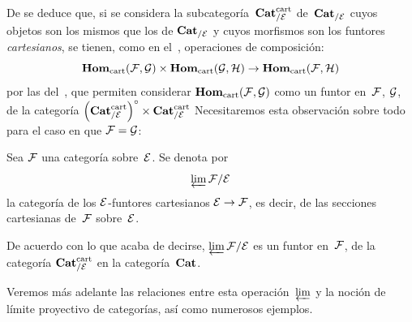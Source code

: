 De
se deduce que, si se considera la subcategoría~$\Cat^\cart_{/\cal{E}}$
\label{indnot:fr}%
de~$\Cat_{/\cal{E}}$ cuyos objetos son los mismos que los de
$\Cat_{/\cal{E}}$ y cuyos morfismos son los funtores \emph{cartesianos},
se tienen, como en el~\No {}, operaciones de composición:
$$
\SheafHom_\cart(\cal{F},\cal{G})\times
\SheafHom_\cart(\cal{G},\cal{H})\to\SheafHom_\cart(\cal{F},\cal{H})
$$
por las del~\No {}, que permiten considerar
$\SheafHom_\cart(\cal{F},\cal{G})$ como un funtor en~$\cal{F}$,
$\cal{G}$, de la categoría $\left(\Cat^\cart_{/\cal{E}}\right)^\circ
\times\Cat^\cart_{/\cal{E}}$
Necesitaremos esta observación sobre todo para el caso en que
$\cal{F}=\cal{G}$:

\begin{definition}
\label{VI.5.5}
Sea $\cal{F}$ una categoría sobre~$\cal{E}$. Se denota por
$$
\varprojLim\cal{F}/\cal{E}
$$
\label{indnot:fs}%
la categoría de los $\cal{E}$-funtores cartesianos
$\cal{E}\to\cal{F}$, es decir, de las secciones cartesianas de~$\cal{F}$
sobre~$\cal{E}$.
\end{definition}

De acuerdo con lo que acaba de decirse,
$\varprojLim\cal{F}/\cal{E}$ es un funtor en~$\cal{F}$, de la categoría
$\Cat^\cart_{/\cal{E}}$ en la categoría~$\Cat$.

Veremos más adelante las relaciones entre esta operación~$\varprojLim$ y la
noción de límite proyectivo de categorías, así como numerosos ejemplos.
